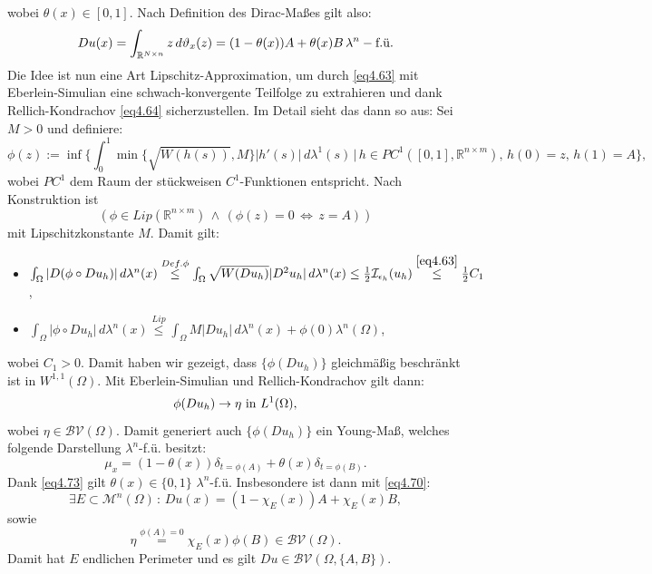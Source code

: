 wobei \(\theta(x) \in [0,1]\). Nach Definition des Dirac-Maßes gilt also:
\begin{equation}{\label{eq4.70}}
    Du(x) = \int_{\mathbb{R}^{N \times n}} z \,d\vartheta_x(z) = (1-\theta(x))A + \theta(x)B \, \lambda^n-\text{f.ü.}
\end{equation}
Die Idee ist nun eine Art Lipschitz-Approximation, um durch \eqref{eq4.63} mit Eberlein-Simulian eine schwach-konvergente Teilfolge zu extrahieren und dank Rellich-Kondrachov \eqref{eq4.64} sicherzustellen. Im Detail sieht das dann so aus: Sei \(M>0\) und definiere:
\begin{equation}
    \phi(z) := \inf \{\int^1_0 \min \{\sqrt{W(h(s))},M\} |h'(s)| \,d\lambda^1(s) \, | \, h \in PC^1([0,1],\mathbb{R}^{n \times m}), \, h(0) = z, \, h(1) = A\},
\end{equation}
wobei \(PC^1\) dem Raum der stückweisen \(C^1\)-Funktionen entspricht. Nach Konstruktion ist
\begin{equation}
    (\phi \in Lip(\mathbb{R}^{n \times m}) \, \land \, (\phi(z) = 0 \, \Leftrightarrow \, z = A))
\end{equation}
mit Lipschitzkonstante \(M\). Damit gilt:
\begin{itemize}
    \item \(\int_{\Omega}|D(\phi \circ Du_h)| \,d\lambda^n(x) \stackrel{Def. \phi}{\leq} \int_{\Omega} \sqrt{W(Du_h)} |D^2u_h| \,d\lambda^n(x) \leq \frac{1}{2} \mathcal{I}_{\epsilon_h} (u_h) \stackrel{\eqref{eq4.63}}{\leq} \frac{1}{2}C_1\),
    \item \(\int_{\Omega} |\phi \circ Du_h| \,d\lambda^n(x) \stackrel{Lip}{\leq} \int_{\Omega} M |Du_h| \,d\lambda^n(x) + \phi(0) \lambda^n(\Omega)\),
\end{itemize}
wobei \(C_1 > 0\). Damit haben wir gezeigt, dass \(\{\phi(Du_h)\}\) gleichmäßig beschränkt ist in \(W^{1,1}(\Omega)\). Mit Eberlein-Simulian und Rellich-Kondrachov gilt dann:
\begin{equation}{\label{eq4.73}}
    \phi(Du_h) \to \eta \text{ in }L^1(\Omega),
\end{equation}
wobei \(\eta \in \mathcal{BV}(\Omega)\). Damit generiert auch \(\{\phi(Du_h)\}\) ein Young-Maß, welches folgende Darstellung \(\lambda^n\)-f.ü. besitzt:
\begin{equation}
    \mu_x = (1-\theta(x)) \delta_{t=\phi(A)} + \theta(x) \delta_{t=\phi(B)}.
\end{equation}
Dank \eqref{eq4.73} gilt \(\theta(x) \in \{0,1\}\) \(\lambda^n\)-f.ü. Insbesondere ist dann mit \eqref{eq4.70}:
\begin{equation}
    \exists E \subset \mathcal{M}^n(\Omega) \, : \, Du(x) = (1- \chi_E(x))A + \chi_E(x)B,
\end{equation}
sowie
\begin{equation}
    \eta \stackrel{\phi(A)=0}{=} \chi_E(x) \phi(B) \in \mathcal{BV}(\Omega).
\end{equation}
Damit hat \(E\) endlichen Perimeter und es gilt \(Du \in \mathcal{BV}(\Omega,\{A,B\})\). \QEDB

